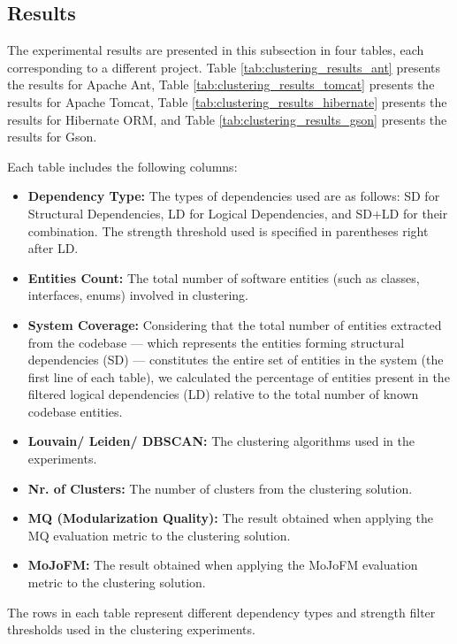 \documentclass[12pt, a4paper, twoside]{report}
\begin{document}
\subsection{Results}
\label{subsec:results}

The experimental results are presented in this subsection in four tables, each corresponding to a different project. Table \ref{tab:clustering_results_ant} presents the results for Apache Ant, Table \ref{tab:clustering_results_tomcat} presents the results for Apache Tomcat, Table \ref{tab:clustering_results_hibernate} presents the results for Hibernate ORM, and Table \ref{tab:clustering_results_gson} presents the results for Gson.

Each table includes the following columns:
\begin{itemize}
\item \textbf{Dependency Type:} The types of dependencies used are as follows: SD for Structural Dependencies, LD for Logical Dependencies, and SD+LD for their combination. The strength threshold used is specified in parentheses right after LD.
\item \textbf{Entities Count:} The total number of software entities (such as classes, interfaces, enums) involved in clustering.
\item \textbf{System Coverage:} Considering that the total number of entities extracted from the codebase — which represents the entities forming structural dependencies (SD) — constitutes the entire set of entities in the system (the first line of each table), we calculated the percentage of entities present in the filtered logical dependencies (LD) relative to the total number of known codebase entities.
\item \textbf{Louvain/ Leiden/ DBSCAN:} The clustering algorithms used in the experiments.
\item \textbf{Nr. of Clusters:} The number of clusters from the clustering solution.
\item \textbf{MQ (Modularization Quality):} The result obtained when applying the MQ evaluation metric to the clustering solution.
\item \textbf{MoJoFM:} The result obtained when applying the MoJoFM evaluation metric to the clustering solution.
\end{itemize}

The rows in each table represent different dependency types and strength filter thresholds used in the clustering experiments.
\end{document}
